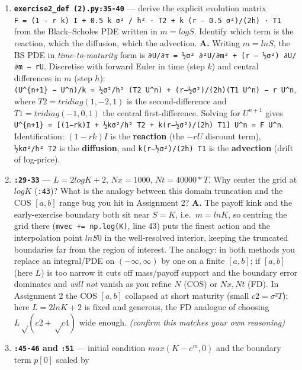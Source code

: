 \documentclass[
  11pt,
]{article}
\begin{document}
\begin{enumerate}
\def\labelenumi{\arabic{enumi}.}
\setcounter{enumi}{9}
\item
  \textbf{\texttt{exercise2\_def\ (2).py:35-40}} --- derive the explicit
  evolution matrix
  \texttt{F\ =\ (1\ -\ r\ k)\ I\ +\ 0.5\ k\ σ²\ /\ h²\ ·\ T2\ +\ k\ (r\ -\ 0.5\ σ²)/(2h)\ ·\ T1}
  from the Black--Scholes PDE written in \(m = log S\). Identify which
  term is the reaction, which the diffusion, which the advection.
  \textbf{A.} Writing \(m = ln S\), the BS PDE in
  \emph{time-to-maturity} form is
  \texttt{∂U/∂τ\ =\ ½σ²\ ∂²U/∂m²\ +\ (r\ −\ ½σ²)\ ∂U/∂m\ −\ rU}.
  Discretise with forward Euler in time (step \(k\)) and central
  differences in \(m\) (step \(h\)):
  \texttt{(U\^{}\{n+1\}\ −\ U\^{}n)/k\ =\ ½σ²/h²\ (T2\ U\^{}n)\ +\ (r−½σ²)/(2h)(T1\ U\^{}n)\ −\ r\ U\^{}n},
  where \(T2 = tridiag(1,−2,1)\) is the second-difference and
  \(T1 = tridiag(−1,0,1)\) the central first-difference. Solving for
  \(U^{n+1}\) gives
  \texttt{U\^{}\{n+1\}\ =\ {[}(1−rk)I\ +\ ½kσ²/h²\ T2\ +\ k(r−½σ²)/(2h)\ T1{]}\ U\^{}n\ =\ F\ U\^{}n}.
  Identification: \((1−rk)I\) is the \textbf{reaction} (the \(−rU\)
  discount term), \texttt{½kσ²/h²\ T2} is the \textbf{diffusion}, and
  \texttt{k(r−½σ²)/(2h)\ T1} is the \textbf{advection} (drift of
  log-price).
\item
  \textbf{\texttt{:29-33}} --- \(L = 2 log K + 2\), \(Nx = 1000\),
  \(Nt = 40000*T\). Why center the grid at \(log K\) (\texttt{:43})?
  What is the analogy between this domain truncation and the COS
  \([a,b]\) range bug you hit in Assignment 2? \textbf{A.} The payoff
  kink and the early-exercise boundary both sit near \(S=K\),
  i.e.~\(m=ln K\), so centring the grid there
  (\texttt{mvec\ +=\ np.log(K)}, line 43) puts the finest action and the
  interpolation point \(ln S0\) in the well-resolved interior, keeping
  the truncated boundaries far from the region of interest. The analogy:
  in both methods you replace an integral/PDE on \((−∞,∞)\) by one on a
  finite \([a,b]\); if \([a,b]\) (here \(L\)) is too narrow it cuts off
  mass/payoff support and the boundary error dominates and \emph{will
  not} vanish as you refine \(N\) (COS) or \(Nx,Nt\) (FD). In Assignment
  2 the COS \([a,b]\) collapsed at short maturity (small \(c2=σ²T\));
  here \(L = 2ln K + 2\) is fixed and generous, the FD analogue of
  choosing \(L√(c2+√c4)\) wide enough. \emph{(confirm this matches your
  own reasoning)}
\item
  \textbf{\texttt{:45-46} and \texttt{:51}} --- initial condition
  \(max(K - e^m, 0)\) and the boundary term \(p[0]\) scaled by

\end{enumerate}
\end{document}
